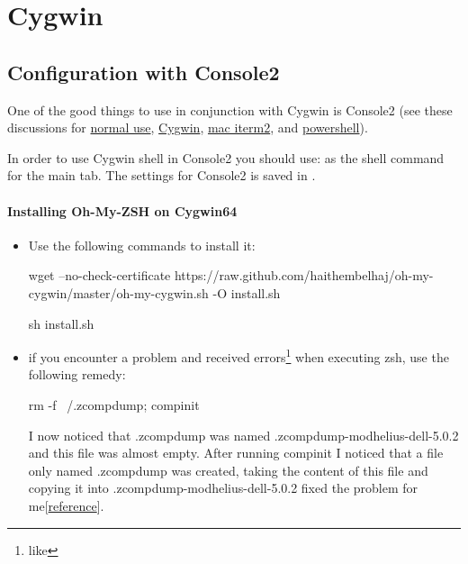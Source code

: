 \section{Cygwin}
\subsection{Configuration with Console2}
One of the good things to use in conjunction with Cygwin is Console2 (see these discussions for \href{http://www.hanselman.com/blog/Console2ABetterWindowsCommandPrompt.aspx}{normal use},  \href{https://blog.openshift.com/upgrade-cygwin-to-console2-and-improve-the-productivity-of-openshifts-rhc-client-tools-on-wind/}{Cygwin}, \href{http://szarapka.com/zshohmyzsh/}{mac iterm2}, and \href{http://gurustop.net/blog/2010/12/23/small-tip-using-console2-with-powershell/}{powershell}).

In order to use Cygwin shell in Console2 you should use:
 as the shell command for the main tab. The settings for Console2 is saved in .

\paragraph{Installing Oh-My-ZSH on Cygwin64}
\label{cygwin:error}
\begin{itemize}
	\item Use the following commands to install it:\newline
\begin{jscode}
wget --no-check-certificate https://raw.github.com/haithembelhaj/oh-my-cygwin/master/oh-my-cygwin.sh -O install.sh

sh install.sh
\end{jscode}

	\item if you encounter a problem and received errors\footnote{ like } when executing zsh, use the following remedy:\newline
\begin{jscode}
rm -f ~/.zcompdump; compinit
\end{jscode}
I now noticed that .zcompdump was named .zcompdump-modhelius-dell-5.0.2 and this file was almost empty. After running compinit I noticed that a file only named .zcompdump was created, taking the content of this file and copying it into .zcompdump-modhelius-dell-5.0.2 fixed the problem for me[\href{https://github.com/robbyrussell/oh-my-zsh/issues/630#issuecomment-35269324}{reference}].
\end{itemize}

